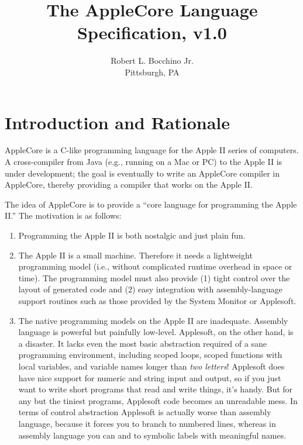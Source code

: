 \documentclass[10pt]{article}
\begin{document}
\title{\bfseries{The AppleCore Language Specification, v1.0}}
%
\author{Robert L. Bocchino Jr.\\
Pittsburgh, PA}
%

\maketitle

\section{Introduction and Rationale}

AppleCore is a C-like programming language for the Apple II series of
computers.  A cross-compiler from Java (e.g., running on a Mac or PC)
to the Apple II is under development; the goal is eventually to write
an AppleCore compiler in AppleCore, thereby providing a compiler that
works on the Apple II.

The idea of AppleCore is to provide a ``core language for programming
the Apple II.''  The motivation is as follows:
%
\begin{enumerate}
%
\item Programming the Apple II is both nostalgic and just plain fun.
%
\item The Apple II is a small machine.  Therefore it needs a
  lightweight programming model (i.e., without complicated runtime
  overhead in space or time).  The programming model must also provide
  (1) tight control over the layout of generated code and (2) easy
  integration with assembly-language support routines such as those
  provided by the System Monitor or Applesoft.
%
\item The native programming models on the Apple II are inadequate.
  Assembly language is powerful but painfully low-level.  Applesoft,
  on the other hand, is a disaster.  It lacks even the most basic
  abstraction required of a sane programming environment, including
  scoped loops, scoped functions with local variables, and variable
  names longer than \emph{two letters}!  Applesoft does have nice
  support for numeric and string input and output, so if you just want
  to write short programs that read and write things, it's handy. But
  for any but the tiniest programs, Applesoft code becomes an
  unreadable mess.  In terms of control abstraction Applesoft is
  actually worse than assembly language, because it forces you to
  branch to numbered lines, whereas in assembly language you can
   and  to symbolic labels with meaningful names.
%
\end{enumerate}
\end{document}
